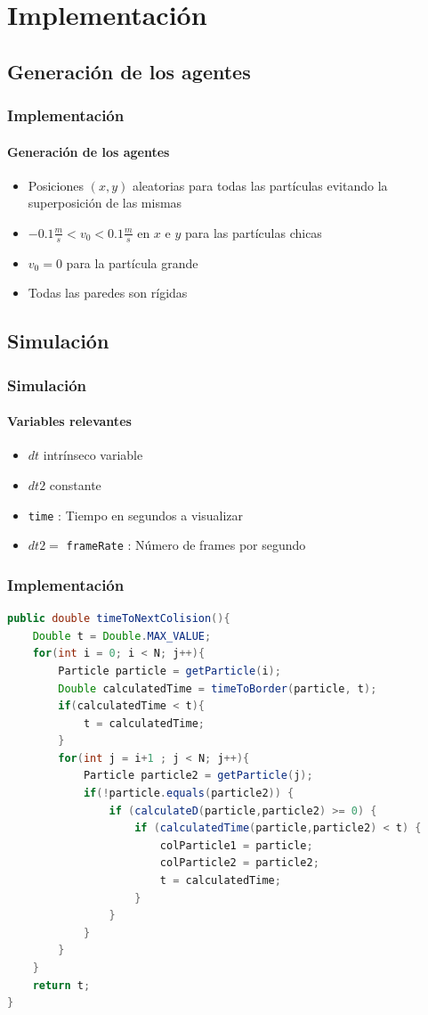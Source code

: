 \documentclass[hyperref={pdfpagelayout=SinglePage}]{beamer}
\begin{document}
\section{Implementación}

\subsection{Generación de los agentes}

\begin{frame}
\frametitle{Implementación}
\framesubtitle{Generación de los agentes}
\begin{itemize}
	\item Posiciones $(x,y)$ aleatorias para todas las partículas evitando la superposición de las mismas
	\item $-0.1 \frac{m}{s} < v_{0} < 0.1 \frac{m}{s}$ en $x$ e $y$ para las partículas chicas
	\item $v_{0} = 0$ para la partícula grande
	\item Todas las paredes son rígidas
\end{itemize}
\end{frame}

\subsection{Simulación}

\begin{frame}
\frametitle{Simulación}
\framesubtitle{Variables relevantes}
\begin{itemize}
	\item $dt$ intrínseco variable
	\item $dt2$ constante
	\item \texttt{time} : Tiempo en segundos a visualizar
	\item $dt2 =$ \texttt{frameRate} : Número de frames por segundo
\end{itemize}
\end{frame}

\begin{frame}[fragile]
\frametitle{Implementación}
\begin{lstlisting}[language=Java, caption = Función para obtener el tiempo de la próxima colisión.]
public double timeToNextColision(){
	Double t = Double.MAX_VALUE;
	for(int i = 0; i < N; j++){
		Particle particle = getParticle(i);
		Double calculatedTime = timeToBorder(particle, t);
		if(calculatedTime < t){
			t = calculatedTime;
		}
		for(int j = i+1 ; j < N; j++){
			Particle particle2 = getParticle(j);
			if(!particle.equals(particle2)) {
				if (calculateD(particle,particle2) >= 0) {
					if (calculatedTime(particle,particle2) < t) {
						colParticle1 = particle;
						colParticle2 = particle2;
						t = calculatedTime;
					}
				}
			}
		}
	}
	return t;
}
\end{lstlisting}
\end{frame}
\end{document}
